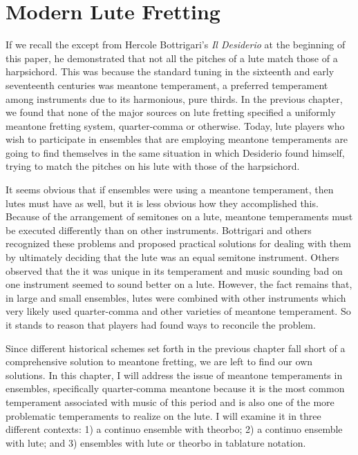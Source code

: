 \chapter{Modern Lute Fretting}

If we recall the except from Hercole Bottrigari's \textit{Il Desiderio} at the beginning of this
paper, he demonstrated that not all the pitches of a lute match  those of a harpsichord.  This was
because the standard tuning in the sixteenth and early seventeenth centuries was meantone
temperament, a preferred temperament among instruments due to its harmonious, pure thirds. In the
previous  chapter, we found that none of the major sources on lute fretting specified a uniformly
meantone fretting system, quarter-comma or otherwise. Today, lute players who wish to participate in
ensembles that are employing meantone temperaments are going to find themselves in the same
situation in which Desiderio found himself, trying to match the pitches on his lute with those of
the harpsichord.

It seems obvious that if ensembles were using a meantone temperament, then lutes must have as well,
but it is less obvious how they accomplished this. Because of the arrangement of semitones on a
lute, meantone temperaments must be executed differently than on other instruments.  Bottrigari and
others recognized these problems and proposed practical solutions for dealing with them by
ultimately deciding that the lute was an equal semitone instrument.  Others observed that the it was
unique in its temperament and music sounding bad on one instrument seemed to sound better on a
lute.\autocite[45]{ML:1}  However, the fact remains that, in large and small ensembles, lutes were
combined with other instruments which very likely used quarter-comma and other varieties of meantone
temperament.  So it stands to reason that players had found ways to reconcile the problem.

Since different historical schemes set forth in the previous chapter fall short of a comprehensive
solution to meantone fretting, we are left to find our own solutions. In this chapter, I will
address the issue of meantone temperaments in ensembles, specifically quarter-comma meantone because
it is the most common temperament associated with music of this period and is also one of the more
problematic temperaments to realize on the lute. I will examine it in three different contexts: 1) a
continuo ensemble with theorbo; 2) a continuo ensemble with lute; and 3) ensembles with lute or
theorbo in tablature notation.

